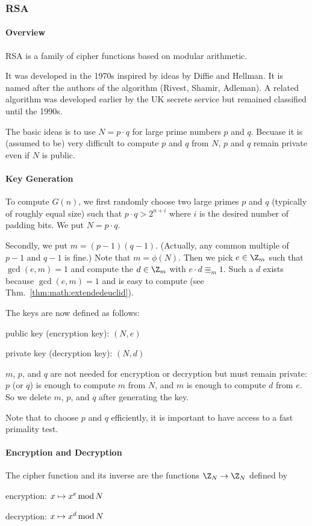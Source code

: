 \subsubsection{RSA}

\paragraph{Overview}
RSA is a family of cipher functions based on modular arithmetic.

It was developed in the 1970s inspired by ideas by Diffie and Hellman.
It is named after the authors of the algorithm (Rivest, Shamir, Adleman).
A related algorithm was developed earlier by the UK secrete service but remained classified until the 1990s.

The basic ideas is to use $N=p\cdot q$ for large prime numbers $p$ and $q$.
Becuase it is (assumed to be) very difficult to compute $p$ and $q$ from $N$, $p$ and $q$ remain private even if $N$ is public.

\paragraph{Key Generation}
To compute $G(n)$, we first randomly choose two large primes $p$ and $q$ (typically of roughly equal size) such that $p\cdot q>2^{n+i}$ where $i$ is the desired number of padding bits.
We put $N=p\cdot q$.

Secondly, we put $m=(p-1)(q-1)$. (Actually, any common multiple of $p-1$ and $q-1$ is fine.)
Note that $m=\phi(N)$.
Then we pick $e\in \Z_m$ such that $\gcd(e,m)=1$ and compute the $d\in\Z_m$ with $e\cdot d\Equiv_m 1$.
Such a $d$ exists because $\gcd(e,m)=1$ and is easy to compute (see Thm.~\ref{thm:math:extendedeuclid}).

The keys are now defined as follows:
\begin{compactitem}
 \item public key (encryption key): $(N,e)$
 \item private key (decryption key): $(N,d)$
\end{compactitem}
$m$, $p$, and $q$ are not needed for encryption or decryption but must remain private: $p$ (or $q$) is enough to compute $m$ from $N$, and $m$ is enough to compute $d$ from $e$.
So we delete $m$, $p$, and $q$ after generating the key.

Note that to choose $p$ and $q$ efficiently, it is important to have access to a fast primality test.

\paragraph{Encryption and Decryption}
The cipher function and its inverse are the functions $\Z_N\to \Z_N$ defined by
\begin{compactitem}
 \item encryption: $x\mapsto x^e\mathop{\mathrm{mod}} N$
 \item decryption: $x\mapsto x^d\mathop{\mathrm{mod}} N$
\end{compactitem}

